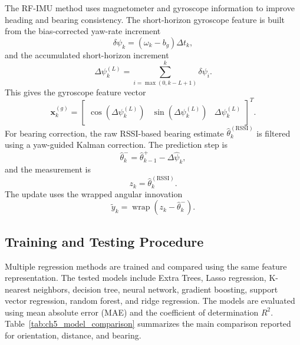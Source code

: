 \documentclass{uhcoethesis}
\begin{document}
The RF-IMU method uses magnetometer and gyroscope information to improve heading and bearing consistency. The short-horizon gyroscope feature is built from the bias-corrected yaw-rate increment
\begin{equation}
    \delta\psi_k=(\omega_k-b_g)\Delta t_k,
    \label{eq:ch5_delta_psi}
\end{equation}
and the accumulated short-horizon increment
\begin{equation}
    \Delta\psi_k^{(L)}
    =
    \sum_{i=\max(0,k-L+1)}^{k}\delta\psi_i.
    \label{eq:ch5_short_horizon_gyro}
\end{equation}
This gives the gyroscope feature vector
\begin{equation}
    \mathbf{x}^{(g)}_k =
    \begin{bmatrix}
    \cos(\Delta\psi_k^{(L)}) &
    \sin(\Delta\psi_k^{(L)}) &
    \Delta\psi_k^{(L)}
    \end{bmatrix}^{T}.
    \label{eq:ch5_gyro_features}
\end{equation}
For bearing correction, the raw RSSI-based bearing estimate $\hat{\theta}_k^{(\mathrm{RSSI})}$ is filtered using a yaw-guided Kalman correction. The prediction step is
\begin{equation}
    \hat{\theta}_k^{-}
    =
    \hat{\theta}_{k-1}^{+}
    -
    \Delta\hat{\psi}_k,
    \label{eq:ch5_theta_prediction}
\end{equation}
and the measurement is
\begin{equation}
    z_k=\hat{\theta}_k^{(\mathrm{RSSI})}.
    \label{eq:ch5_theta_measurement}
\end{equation}
The update uses the wrapped angular innovation
\begin{equation}
    \tilde{y}_k =
    \operatorname{wrap}(z_k-\hat{\theta}_k^{-}).
    \label{eq:ch5_wrapped_innovation}
\end{equation}

\subsection{Training and Testing Procedure}

Multiple regression methods are trained and compared using the same feature representation. The tested models include Extra Trees, Lasso regression, K-nearest neighbors, decision tree, neural network, gradient boosting, support vector regression, random forest, and ridge regression. The models are evaluated using mean absolute error (MAE) and the coefficient of determination $R^2$. Table~\ref{tab:ch5_model_comparison} summarizes the main comparison reported for orientation, distance, and bearing.
\end{document}
